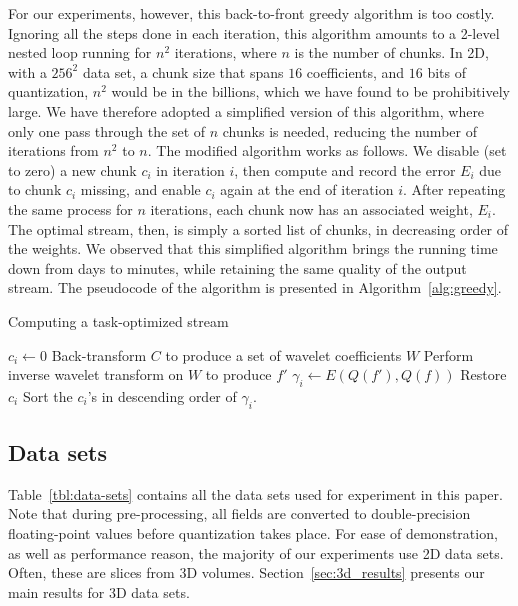For our experiments, however, this back-to-front greedy algorithm is too costly. Ignoring
all the steps done in each iteration, this algorithm amounts to a 2-level nested loop running for
$n^2$ iterations, where $n$ is the number of chunks. In 2D, with a $256^2$ data set, a chunk size
that spans $16$ coefficients, and $16$ bits of quantization, $n^2$ would be in the billions, which
we have found to be prohibitively large. We have therefore adopted a simplified version of this
algorithm, where only one pass through the set of $n$ chunks is needed, reducing the number of
iterations from $n^2$ to $n$. The modified algorithm works as follows. We disable (set to zero) a
new chunk $c_i$ in iteration $i$, then compute and record the error $E_i$ due to chunk $c_i$
missing, and enable $c_i$ again at the end of iteration $i$. After repeating the same process for
$n$ iterations, each chunk now has an associated weight, $E_i$. The optimal stream, then, is simply
a sorted list of chunks, in decreasing order of the weights. We observed that this simplified
algorithm brings the running time down from days to minutes, while retaining the same quality of the
output stream. The pseudocode of the algorithm is presented in Algorithm~\ref{alg:greedy}.

\begin{algorithm}[h]
  \caption{Computing a task-optimized stream}
  \begin{algorithmic}[1]
			\State $c_i \gets 0$
      \State Back-transform $C$ to produce a set of wavelet coefficients $W$
			\State Perform inverse wavelet transform on $W$ to produce $f'$
			\State $\gamma_i \gets E(Q(f'),Q(f))$			
			\State Restore $c_i$
		\EndFor
		\State Sort the $c_i$'s in descending order of $\gamma_i$.
	\end{algorithmic}
	\label{alg:greedy}
\end{algorithm}
\subsection{Data sets}
\label{sec:data-sets}

Table~\ref{tbl:data-sets} contains all the data sets used for experiment in this paper. Note that
during pre-processing, all fields are converted to double-precision floating-point values before
quantization takes place. For ease of demonstration, as well as performance reason, the majority of
our experiments use 2D data sets. Often, these are slices from 3D volumes.
Section~\ref{sec:3d_results} presents our main results for 3D data sets. 

